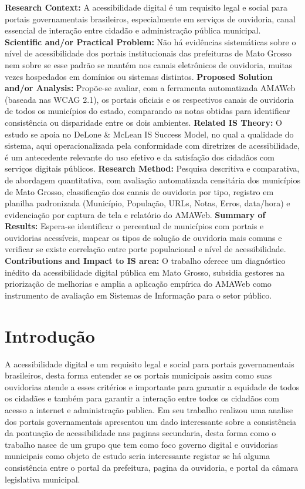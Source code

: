 \documentclass[12pt]{article}
\begin{document}
\begin{resumo} 
\textbf{Research Context:} A acessibilidade digital é um requisito legal e social para portais governamentais brasileiros, especialmente em serviços de ouvidoria, canal essencial de interação entre cidadão e administração pública municipal.
\textbf{Scientific and/or Practical Problem:} Não há evidências sistemáticas sobre o nível de acessibilidade dos portais institucionais das prefeituras de Mato Grosso nem sobre se esse padrão se mantém nos canais eletrônicos de ouvidoria, muitas vezes hospedados em domínios ou sistemas distintos.
\textbf{Proposed Solution and/or Analysis:} Propõe-se avaliar, com a ferramenta automatizada AMAWeb (baseada nas WCAG 2.1), os portais oficiais e os respectivos canais de ouvidoria de todos os municípios do estado, comparando as notas obtidas para identificar consistência ou disparidade entre os dois ambientes.
\textbf{Related IS Theory:} O estudo se apoia no DeLone & McLean IS Success Model, no qual a qualidade do sistema, aqui operacionalizada pela conformidade com diretrizes de acessibilidade, é um antecedente relevante do uso efetivo e da satisfação dos cidadãos com serviços digitais públicos.
\textbf{Research Method:} Pesquisa descritiva e comparativa, de abordagem quantitativa, com avaliação automatizada censitária dos municípios de Mato Grosso, classificação dos canais de ouvidoria por tipo, registro em planilha padronizada (Município, População, URLs, Notas, Erros, data/hora) e evidenciação por captura de tela e relatório do AMAWeb.
\textbf{Summary of Results:} Espera-se identificar o percentual de municípios com portais e ouvidorias acessíveis, mapear os tipos de solução de ouvidoria mais comuns e verificar se existe correlação entre porte populacional e nível de acessibilidade.
\textbf{Contributions and Impact to IS area:} O trabalho oferece um diagnóstico inédito da acessibilidade digital pública em Mato Grosso, subsidia gestores na priorização de melhorias e amplia a aplicação empírica do AMAWeb como instrumento de avaliação em Sistemas de Informação para o setor público.
\end{resumo}


\section{Introdução}

A acessibilidade digital e um requisito legal e social para portais governamentais brasileiros, desta forma entender se os portais municipais assim como suas ouvidorias atende a esses critérios e importante para garantir a equidade de todos os cidadães e também para garantir a interação entre todos os cidadãos com acesso a internet e administração publica. Em seu trabalho \cite{wcge} realizou uma analise dos portais governamentais apresentou um dado interessante sobre a consistência da pontuação de acessibilidade nas paginas secundaria, desta forma como o trabalho nasce de um grupo que tem como foco governo digital e ouvidorias municipais como objeto de estudo seria interessante registar se há alguma consistência entre o portal da prefeitura, pagina da ouvidoria, e portal da câmara legislativa municipal. 
\end{document}
